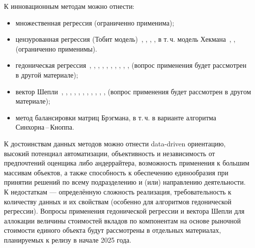 \documentclass[12pt]{scrartcl}
\begin{document}
К инновационным методам можно отнести:
\begin{itemize}
    \item множественная регрессия (ограниченно применима);
    \item цензурованная регрессия (Тобит модель)~\cite{RTobit}, \cite{Breen2003}, \cite{Buchinsky1998}, \cite{Lewbel2002}, в т.\,ч. модель Хекмана~\cite{Winship1992}, \cite{Heckman1974}, \cite{Heckman1976}  (ограниченно применимы).
    \item гедоническая регрессия~\cite{Rosen1974}, \cite{Court1939}, \cite{Chanel1996}, \cite{Pakko2020}, \cite{Malpezzi2002}, \cite{Sirmans2005}, \cite{Bourassa2006}, \cite{Goodman1998}, \cite{Kestens2006}, \cite{Tochaiwat2019}, \cite{BurhaidaBurhan2013} (вопрос применения будет рассмотрен в другой материале);
    \item вектор Шепли~\cite{Shapley1953}, \cite{Neuman1944}, \cite{Osborne1994}, \cite{Yu2004}, \cite{Roth2005}, \cite{Peleg2007}, \cite{Winter_2002}, \cite{Young1995}, \cite{Harsanyi_1982}, \cite{Kenton2024}, \cite{OpenJS2023}, \cite{Meadows2004} (вопрос применения будет рассмотрен в другом материале);
    \item метод балансировки матриц Брэгмана, в т.\,ч. в варианте алгоритма Синхорна\,--\,Кноппа.
\end{itemize}
К достоинствам данных методов можно отнести data-driven ориентацию, высокий потенциал автоматизации, объективность и независимость от предпочтений оценщика либо андеррайтера, возможность применения к большим массивам объектов, а также способность к обеспечению единообразия при принятии решений по всему подразделению и (или) направлению деятельности. К недостаткам --- определённую сложность реализация, требовательность к количеству данных и их свойствам (особенно для алгоритмов гедонической регрессии). Вопросы применения гедонической регрессии и вектора Шепли для аллокации величины стоимостей вкладов по компонентам на основе рыночной стоимости единого объекта будут рассмотрены в отдельных материалах, планируемых к релизу в начале 2025 года.
\end{document}
